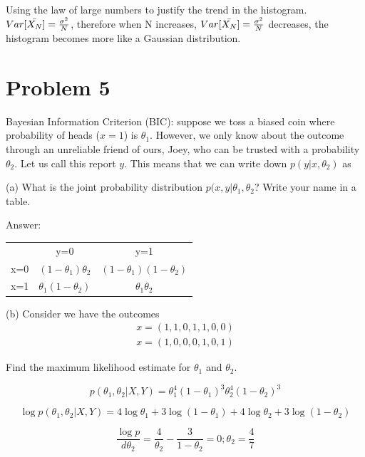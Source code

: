 \documentclass{article}
\begin{document}
Using the law of large numbers to justify the trend in the histogram.
$Var[\Bar{X_{N}}] = \frac{\sigma^2}{N}$, therefore when N increases, $Var[\Bar{X_{N}}]=\frac{\sigma^2}{N}$ decreases, the histogram becomes more like a Gaussian distribution.

\newpage
\section{Problem 5}
Bayesian Information Criterion (BIC): suppose we toss a biased coin where probability of heads ($x=1$) is $\theta_{1}$. However, we only know about the outcome through an unreliable friend of ours, Joey, who can be trusted with a probability $\theta_{2}$. Let us call this report $y$. This means that we can write down $p(y|x,\theta_{2})$ as

(a) What is the joint probability distribution $p(x,y|\theta_{1},\theta_{2}$? Write your name in a table.

Answer:

\begin{center}
\begin{tabular}{ c c c }
   & y=0 & y=1 \\ 
x=0 & $(1-\theta_{1})\theta_{2}$ & $(1-\theta_{1})(1-\theta_{2})$ \\  
x=1 & $\theta_{1}(1-\theta_{2})$ & $\theta_{1}\theta_{2}$  
\end{tabular}
\end{center}

(b) Consider we have the outcomes
\begin{equation}
\begin{aligned}
    x = (1,1,0,1,1,0,0) \\
    x = (1,0,0,0,1,0,1)
\end{aligned}
\end{equation}

Find the maximum likelihood estimate for $\theta_{1}$ and $\theta_{2}$.

\begin{equation}
    p(\theta_{1},\theta_{2}|X,Y) = \theta_{1}^{4}(1-\theta_{1})^{3}\theta_{2}^{4}(1-\theta_{2})^{3}
\end{equation}

\begin{equation}
    \log p(\theta_{1},\theta_{2}|X,Y) = 4\log{\theta_{1}}+3\log{(1-\theta_{1})}+4\log{\theta_{2}}+3\log{(1-\theta_{2})}
\end{equation}

\begin{equation}
    \frac{\log p}{d \theta_{2}} = \frac{4}{\theta_{2}}-\frac{3}{1-\theta_{2}} = 0; \theta_{2}= \frac{4}{7}
\end{equation}
\end{document}
